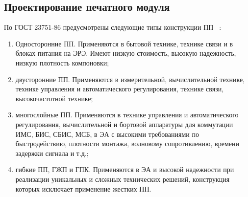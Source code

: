 



 

 

\subsection{Проектирование печатного модуля}
По ГОСТ 23751-86 предусмотрены следующие типы конструкции ПП
~\cite{PirogovaEngineering}:
\begin{enumerate}

\item Односторонние ПП. Применяются в бытовой технике, технике связи
  и в блоках питания на ЭРЭ. Имеют низкую стоимость,
  высокую надежность, низкую плотность компоновки;

\item двусторонние ПП. Применяются в измерительной, вычислительной
  технике, технике управления и автоматического регулирования,
  технике связи, высокочастотной технике;

\item многослойные ПП. Применяются в технике управления и
  автоматического регулирования,
  вычислительной и бортовой аппаратуры для
  коммутации ИМС, БИС, СБИС, МСБ, в ЭА с высокими требованиями по быстродействию,
  плотности монтажа,  волновому сопротивлению, времени задержки сигнала и т.д.;

\item гибкие ПП, ГЖП и ГПК. Применяются в ЭА и высокой надежности
  при реализации уникальных и сложных технических решений,
  конструкция которых исключает применение жестких ПП.
\end{enumerate}


